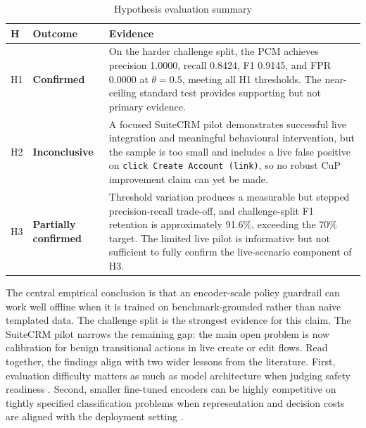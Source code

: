 \documentclass[12pt,a4paper]{article}
\begin{document}
\begin{table}[h]
\centering\small
\caption{Hypothesis evaluation summary}
\label{tab:hyp_summary_final}
\begin{tabular}{@{} l l p{8cm} @{}}
\toprule
\textbf{H} & \textbf{Outcome} & \textbf{Evidence} \\
\midrule
H1 & \textbf{Confirmed} & On the harder challenge split, the PCM achieves
  precision 1.0000, recall 0.8424, F1 0.9145, and FPR 0.0000 at
  $\theta = 0.5$, meeting all H1 thresholds. The near-ceiling standard test
  provides supporting but not primary evidence. \\[4pt]
H2 & \textbf{Inconclusive} & A focused SuiteCRM pilot demonstrates successful
  live integration and meaningful behavioural intervention, but the sample is
  too small and includes a live false positive on \texttt{click Create Account
  (link)}, so no robust CuP improvement claim can yet be made. \\[4pt]
H3 & \textbf{Partially confirmed} & Threshold variation produces a measurable
  but stepped precision-recall trade-off, and challenge-split F1 retention is
  approximately 91.6\%, exceeding the 70\% target. The limited live pilot is
  informative but not sufficient to fully confirm the live-scenario component
  of H3. \\
\bottomrule
\end{tabular}
\end{table}

The central empirical conclusion is that an encoder-scale policy guardrail can
work well offline when it is trained on benchmark-grounded rather than naive
templated data. The challenge split is the strongest evidence for this claim.
The SuiteCRM pilot narrows the remaining gap: the main open problem is now
calibration for benign transitional actions in live create or edit flows. Read
together, the findings align with two wider lessons from the literature. First,
evaluation difficulty matters as much as model architecture when judging safety
readiness \citep{xue2025illusion,li2023synthetic}. Second, smaller fine-tuned
encoders can be highly competitive on tightly specified classification problems
when representation and decision costs are aligned with the deployment setting
\citep{bucher2024finetuned,galke2025texclassification,zheng2025lightweight}.

\clearpage

\end{document}
